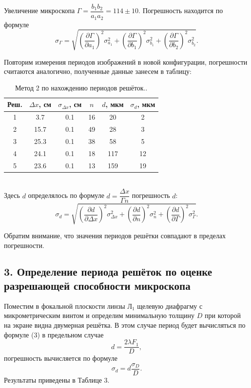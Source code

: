 \documentclass[a4paper, 12pt]{article}%
\begin{document}
Увеличение микроскопа $\Gamma = \dfrac{b_1 b_2}{a_1 a_2} = 114 \pm 10$. Погрешность находится по формуле
$$
\sigma_\Gamma = \sqrt{\left(\dfrac{\partial \Gamma}{\partial a_1}\right)^2 \sigma^2_{a_1} + \left(\dfrac{\partial \Gamma}{\partial b_1}\right)^2 \sigma^2_{b_1} + \left(\dfrac{\partial \Gamma}{\partial b_2}\right)^2 \sigma^2_{b_2}}.
$$
\textbf{       }

Повторим измерения периодов изображений в новой конфигурации, погрешности считаются аналогично, полученные данные занесем в таблицу:

\begin{table}[h]
\begin{tabular}{|c|c|c|c|c|c|}
\hline
Реш. & $\Delta x$, см & $\sigma_{\Delta x}$, см & $n$ & $d$, мкм & $\sigma_d$, мкм \\ \hline
1     & 3.7            & 0.1                     & 16  & 20       & 2               \\ \hline
2     & 15.7           & 0.1                     & 49  & 28       & 3               \\ \hline
3     & 25.3           & 0.1                     & 38  & 58       & 5               \\ \hline
4     & 24.1           & 0.1                     & 18  & 117      & 12              \\ \hline
5     & 23.6           & 0.1                     & 13  & 159      & 19              \\ \hline
\end{tabular}
\centering
\caption{Метод 2 по нахождению периодов решёток..}
\end{table}\\

Здесь $d$ определялось по формуле $d = \dfrac{\Delta x}{\Gamma n}$
погрешность $d$:
$$
\sigma_d = \sqrt{\left(\dfrac{\partial d}{\partial \Delta x}\right)^2 \sigma^2_{\Delta x} + \left(\dfrac{\partial d}{\partial n}\right)^2 \sigma^2_{n} + \left(\dfrac{\partial d}{\partial \Gamma}\right)^2 \sigma^2_{\Gamma}}.
$$
\textbf{       }

Обратим внимание, что значения периодов решётки совпадают в пределах погрешности.

\textbf{       }

\subsection*{3. Определение периода решёток по оценке разрешающей способности микроскопа}
Поместим в фокальной плоскости линзы $\text{Л}_1$ щелевую диафрагму с микрометрическим винтом и определим минимальную толщину $D$ при которой на экране видна двумерная решётка. В этом случае период будет вычисляться по формуле (3) в предельном случае
$$
d = \dfrac{2\lambda F_1}{D},
$$
погрешность вычисляется по формуле 
$$
\sigma_d = d \dfrac{\sigma_D}{D}.
$$
Результаты приведены в Таблице 3.
\textbf{       }
\end{document}

